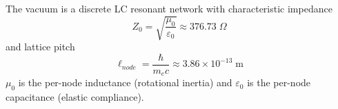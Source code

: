 %
\begin{tcolorbox}[colframe=black!70, colback=gray!5, title=Axiom 1 — Impedance]
The vacuum is a discrete LC resonant network with characteristic impedance
\begin{equation}
    Z_0 = \sqrt{\frac{\mu_0}{\varepsilon_0}} \approx 376.73\;\Omega
    \label{eq:axiom1_impedance}
\end{equation}
and lattice pitch
\begin{equation}
    \ell_{node} = \frac{\hbar}{m_e c} \approx 3.86 \times 10^{-13}\;\text{m}
    \label{eq:axiom1_pitch}
\end{equation}
$\mu_0$ is the per-node inductance (rotational inertia) and $\varepsilon_0$
is the per-node capacitance (elastic compliance).
\end{tcolorbox}
